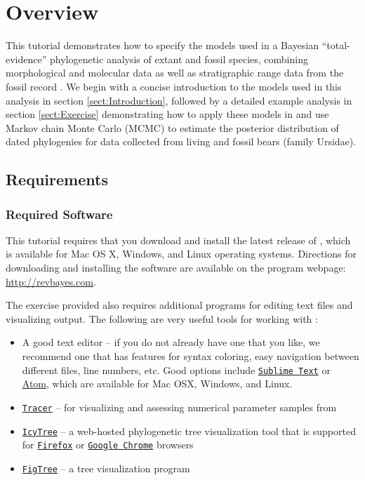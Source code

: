
\section{Overview}\label{sect:Overview}

This tutorial demonstrates how to specify the models used in a Bayesian ``total-evidence'' phylogenetic analysis of extant and fossil species, combining morphological and molecular data as well as stratigraphic range data from the fossil record \citep[\EG][]{Ronquist2012a,Zhang2016,Gavryushkina2016}.
We begin with a concise introduction to the models used in this analysis in section \ref{sect:Introduction}, followed by a detailed example analysis in section \ref{sect:Exercise} demonstrating how to apply these models in \RevBayes \citep{Hoehna2017a} and use Markov chain Monte Carlo (MCMC) to estimate the posterior distribution of dated phylogenies for data collected from living and fossil bears (family Ursidae).

\bigskip
\subsection{Requirements}\label{subsect:Overview-Requirements}

\subsubsection{Required Software}\label{subsub:Req-Software}
This tutorial requires that you download and install the latest release of \RevBayes \citep{Hoehna2017a}, which is available for Mac OS X, Windows, and Linux operating systems. 
Directions for downloading and installing the software are available on the program webpage:
\href{http://revbayes.com/}{http://revbayes.com}.

The exercise provided also requires additional programs for editing text files and visualizing output. 
The following are very useful tools for working with \RevBayes:
\begin{itemize}[noitemsep,topsep=0pt]
\item A good text editor -- if you do not already have one that you like, we recommend one that has features for syntax coloring, easy navigation between different files, line numbers, etc.
Good options include \href{http://www.sublimetext.com/}{\tt Sublime Text} or \href{https://atom.io/}{Atom}, which are available for Mac OSX, Windows, and Linux.
\item \href{http://tree.bio.ed.ac.uk/software/tracer/}{\tt Tracer} -- for visualizing and assessing numerical parameter samples from \RevBayes
\item \href{http://tgvaughan.github.io/icytree/}{\tt IcyTree} -- a web-hosted phylogenetic tree visualization tool that is supported for \href{https://www.mozilla.org/en-US/firefox/products/}{\tt Firefox} or \href{https://www.google.com/chrome/}{\tt Google Chrome} browsers 
\item \href{http://tree.bio.ed.ac.uk/software/figtree/}{\tt FigTree} -- a tree visualization program
\end{itemize}

